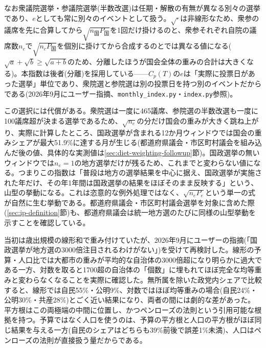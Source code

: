 \documentclass[a4paper,11pt]{ltjsarticle}
\begin{document}
なお衆議院選挙・参議院選挙(半数改選)は任期・解散の有無が異なる別々の選挙であり、$e$としても常に別々のイベントとして扱う。$\sqrt{\cdot}$は非線形なため、衆参の議席を先に合算してから$\sqrt{n_{\text{国}}P_{\text{国}}}$を1回だけ掛けるのと、衆参それぞれ自院の議席数$n_c$で$\sqrt{n_cP_{\text{国}}}$を個別に掛けてから合成するのとでは異なる値になる($\sqrt{a}+\sqrt{b} \geq \sqrt{a+b}$のため、分離したほうが国会全体の重みの合計は大きくなる)。本指数は後者(分離)を採用している——$C_p(T)$の$e$は「実際に投票日があった選挙」単位であり、衆院選と参院選は別の投票日を持つ別のイベントだからである(2026年9月にユーザー指摘、\texttt{monthly\_index.py}・\texttt{index.py}参照)。

この選択には代償がある。衆院選は一度に465議席、参院選の半数改選も一度に100議席超が決まる選挙であるため、$\sqrt{n_e}$の分だけ国会の重みが大きく跳ね上がり、実際に計算したところ、国政選挙が含まれる12か月ウィンドウでは国会の重みシェアが最大51.9\%に達する月が生じる(都道府県議会・市区町村議会を組み込んだ後の値、具体的な実測値は\ref{sec:diet-weighting-followup}節)。国政選挙の無いウィンドウでは$n_e=1$の地方選挙だけが残るため、これまでと変わらない値になる。つまりこの指数は「普段は地方の選挙結果を中心に据え、国政選挙が実施された年だけ、その年1年間は国政選挙の結果をほぼそのまま反映する」という、山型の挙動になる。これは恣意的な例外処理ではなく、$\sqrt{n_eP_e}$という単一の式が自然に生む挙動である。都道府県議会・市区町村議会選挙を対象に含めた際(\ref{sec:ip-definition}節)も、都道府県議会は統一地方選のたびに同様の山型挙動を示すことを確認している。

当初は歳出規模の線形和で重み付けていたが、2026年9月にユーザーの指摘(「国政選挙が地方選の3000倍注目されるわけがない」)を受けて再検討した。線形の予算・人口比では大都市の重みが平均的な自治体の3000倍超になり明らかに過大である一方、対数を取ると1700超の自治体の「個数」に埋もれてほぼ完全な均等重みと変わらなくなることを実際に確認した。無所属を除いた政党内シェアで比較すると、線形では自民55\%・公明9\%、対数ではほぼ均等重みの場合(自民24\%・公明30\%・共産28\%)とごく近い結果になり、両者の間には劇的な差があった。平方根はこの両極端の中間に位置し、かつペンローズの法則という引用可能な根拠を持つ。予算ではなく人口を使うのは、予算の平方根と人口の平方根がほぼ同じ結果を与える一方(自民のシェアはどちらも39\%前後で誤差1\%未満)、人口はペンローズの法則が直接扱う量だからである。
\end{document}
